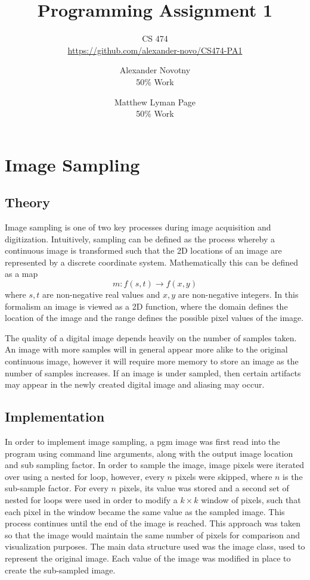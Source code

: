 \documentclass[headings=optiontoheadandtoc,listof=totoc,parskip=full]{scrartcl}
\title{Programming Assignment 1}
\subtitle{CS 474\\\url{https://github.com/alexander-novo/CS474-PA1}}
\author{Alexander Novotny\\50\% Work \and Matthew Lyman Page\\50\% Work}
\begin{document}
\maketitle
\tableofcontents

\newpage

\section{Image Sampling}

\subsection{Theory}
Image sampling is one of two key processes during image acquisition and digitization. Intuitively, sampling can be defined as the process whereby a continuous image is transformed such that the 2D locations of an image are represented by a discrete coordinate system. Mathematically this can be defined as a map \[
	m:f(s, t) \rightarrow f(x, y)
\]where $s, t$ are non-negative real values and $x, y$ are non-negative integers. In this formalism an image is viewed as a 2D function, where the domain defines the location of the image and the range defines the possible pixel values of the image.

The quality of a digital image depends heavily on the number of samples taken. An image with more samples will in general appear more alike to the original continuous image, however it will require more memory to store an image as the number of samples increases. If an image is under sampled, then certain artifacts may appear in the newly created digital image and aliasing may occur.

\subsection{Implementation}
In order to implement image sampling, a pgm image was first read into the program using command line arguments, along with the output image location and sub sampling factor. In order to sample the image, image pixels were iterated over using a nested for loop, however, every $n$ pixels were skipped, where $n$ is the sub-sample factor. For every $n$ pixels, its value was stored and a second set of nested for loops were used in order to modify a $k \times k$ window of pixels, such that each pixel in the window became the same value as the sampled image. This process continues until the end of the image is reached. This approach was taken so that the image would maintain the same number of pixels for comparison and visualization purposes. The main data structure used was the image class, used to represent the original image. Each value of the image was modified in place to create the sub-sampled image.
\end{document}
